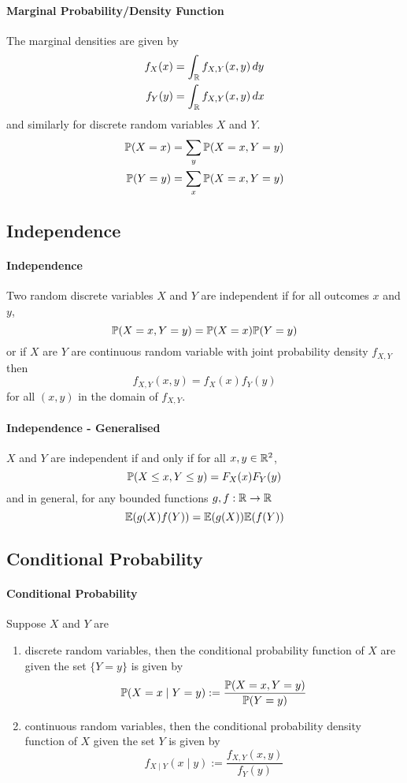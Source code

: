 \paragraph{Marginal Probability/Density Function}
The marginal densities are given by
\begin{align*}
    f_X(x) & = \int_{\mathbb{R}} f_{X,Y}(x,y) \, dy \\
    f_Y(y) & = \int_{\mathbb{R}} f_{X,Y}(x,y) \, dx
\end{align*}
and similarly for discrete random variables \(X\) and \(Y\).
\begin{align*}
    \mathbb{P}(X = x) & = \sum_y \mathbb{P}(X = x, Y = y) \\
    \mathbb{P}(Y = y) & = \sum_x \mathbb{P}(X = x, Y = y)
\end{align*}

\subsection{Independence}
\paragraph{Independence}
Two random discrete variables \(X\) and \(Y\) are independent if for all outcomes \(x\) and \(y\),
\[\mathbb{P}(X = x, Y = y) = \mathbb{P}(X = x)\mathbb{P}(Y = y)\]
or if \(X\) are \(Y\) are continuous random variable with joint probability density \(f_{X,Y}\) then
\[f_{X,Y} (x,y) = f_X(x) f_Y(y)\]
for all \((x,y)\) in the domain of \(f_{X,Y}\).

\paragraph{Independence - Generalised}
\(X\) and \(Y\) are independent if and only if for all \(x,y \in \mathbb{R}^2\),
\[\mathbb{P}(X \leq x, Y \leq y) = F_X(x)F_Y(y)\]
and in general, for any bounded functions \(g,f:\mathbb{R} \to \mathbb{R}\)
\[\mathbb{E}(g(X)f(Y)) = \mathbb{E}(g(X))\mathbb{E}(f(Y))\]

\subsection{Conditional Probability}
\paragraph{Conditional Probability}
Suppose \(X\) and \(Y\) are
\begin{enumerate}
    \item discrete random variables, then the conditional probability function of \(X\) are given the set \(\{Y = y\}\) is given by
    \[\mathbb{P}(X = x \mid Y = y) := \frac{\mathbb{P}(X = x, Y = y)}{\mathbb{P}(Y = y)}\]
    \item continuous random variables, then the conditional probability density function of \(X\) given the set \(Y\) is given by
    \[f_{X \mid Y}(x \mid y) := \frac{f_{X,Y}(x,y)}{f_Y(y)}\]
\end{enumerate}

